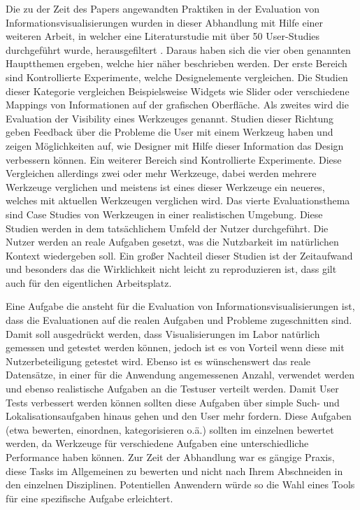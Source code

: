 \documentclass[draft=false
              ,paper=a4
              ,twoside=false
              ,fontsize=11pt
              ,headsepline
              ,BCOR10mm
              ,DIV11
              ]{scrbook}
\begin{document}
Die zu der Zeit des Papers angewandten Praktiken in der Evaluation von Informationsvisualisierungen wurden in dieser Abhandlung mit Hilfe einer weiteren Arbeit, in welcher eine Literaturstudie mit über 50 User-Studies durchgeführt wurde, herausgefiltert \cite{komlodi2004information}. Daraus haben sich die vier oben genannten Hauptthemen ergeben, welche hier näher beschrieben werden. Der erste Bereich sind Kontrollierte Experimente, welche Designelemente vergleichen. Die Studien dieser Kategorie vergleichen Beispielsweise Widgets wie Slider oder verschiedene Mappings von Informationen auf der grafischen Oberfläche.
Als zweites wird die Evaluation der Visibility eines Werkzeuges genannt. Studien dieser Richtung geben Feedback über die Probleme die User mit einem Werkzeug haben und zeigen Möglichkeiten auf, wie Designer mit Hilfe dieser Information das Design verbessern können. Ein weiterer Bereich sind Kontrollierte Experimente. Diese Vergleichen allerdings zwei oder mehr Werkzeuge, dabei werden mehrere Werkzeuge verglichen und meistens ist eines dieser Werkzeuge ein neueres, welches mit aktuellen Werkzeugen verglichen wird. Das vierte Evaluationsthema sind Case Studies von Werkzeugen in einer realistischen Umgebung. Diese Studien werden in dem tatsächlichem Umfeld der Nutzer durchgeführt. Die Nutzer werden an reale Aufgaben gesetzt, was die Nutzbarkeit im natürlichen Kontext wiedergeben soll. Ein großer Nachteil dieser Studien ist der Zeitaufwand und besonders das die Wirklichkeit nicht leicht zu reproduzieren ist, dass gilt auch für den eigentlichen Arbeitsplatz.

Eine Aufgabe die ansteht für die Evaluation von Informationsvisualisierungen ist, dass die Evaluationen auf die realen Aufgaben und Probleme zugeschnitten sind. Damit soll ausgedrückt werden, dass Visualisierungen im Labor natürlich gemessen und getestet werden können, jedoch ist es von Vorteil wenn diese mit Nutzerbeteiligung getestet wird. Ebenso ist es wünschenswert das reale Datensätze, in einer für die Anwendung angemessenen Anzahl, verwendet werden und ebenso realistische Aufgaben an die Testuser verteilt werden. Damit User Tests verbessert werden können sollten diese Aufgaben über simple Such- und Lokalisationsaufgaben hinaus gehen und den User mehr fordern. Diese Aufgaben (etwa bewerten, einordnen, kategorisieren o.ä.) sollten im einzelnen bewertet werden, da Werkzeuge für verschiedene Aufgaben eine unterschiedliche Performance haben können. Zur Zeit der Abhandlung war es gängige Praxis, diese Tasks im Allgemeinen zu bewerten und nicht nach Ihrem Abschneiden in den einzelnen Disziplinen. Potentiellen Anwendern würde so die Wahl eines Tools für eine spezifische Aufgabe erleichtert.
\end{document}
